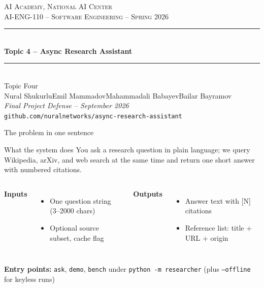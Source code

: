 \documentclass[aspectratio=169,11pt]{beamer}
\newcommand{\teamname}{Topic Four}
\newcommand{\topicchoice}{Topic 4 -- Async Research Assistant}
\newcommand{\memberone}{Nural Shukurlu}
\newcommand{\membertwo}{Emil Mammadov}
\newcommand{\memberthree}{Mahammadali Babayev}
\newcommand{\memberfour}{Bailar Bayramov}
\newcommand{\repolink}{github.com/nuralnetworks/async-research-assistant}
\newcommand{\coursecode}{AI-ENG-110}
\newcommand{\coursename}{Software Engineering}
\newcommand{\institution}{AI Academy, National AI Center}
\newcommand{\semester}{Spring 2026}
\begin{document}
{%
\begin{frame}[plain]
  \begin{center}
    \vspace{0.6cm}
    {\small \textsc{\institution}}\\[0.2em]
    {\small \textsc{\coursecode{} -- \coursename{} -- \semester{}}}\\[1.2em]
    \rule{0.7\textwidth}{0.6pt}\\[0.4em]
    {\Huge\bfseries\color{accent} \topicchoice}\\[0.4em]
    \rule{0.7\textwidth}{0.6pt}\\[1.2em]
    {\large \teamname}\\[0.6em]
    {\normalsize \memberone\quad\textbullet\quad\membertwo\quad\textbullet\quad\memberthree\quad\textbullet\quad\memberfour}\\[1cm]
    {\footnotesize\itshape Final Project Defense -- September 2026}\\[0.4em]
    {\footnotesize\texttt{\repolink}}
  \end{center}
\end{frame}
}

\begin{frame}{The problem in one sentence}
  \begin{block}{What the system does}
    You ask a research question in plain language; we query Wikipedia, arXiv, and web search at the same time and return one short answer with numbered citations.
  \end{block}

  \vspace{0.3em}
  \begin{columns}[T,onlytextwidth]
  \textbf{Inputs}
  \begin{itemize}
    \item One question string (3--2000 chars)
    \item Optional source subset, cache flag
  \end{itemize}

  \textbf{Outputs}
  \begin{itemize}
    \item Answer text with [N] citations
    \item Reference list: title + URL + origin
  \end{itemize}
  \end{columns}

  \vspace{0.4em}
  \textbf{Entry points:} \texttt{ask}, \texttt{demo}, \texttt{bench} under \texttt{python -m researcher} (plus \texttt{--offline} for keyless runs)
\end{frame}
\end{document}
